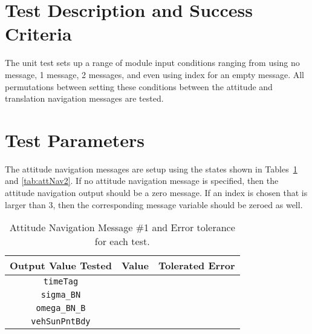
\section{Test Description and Success Criteria}
The unit test sets up a range of module input conditions ranging from using no message, 1 message, 2 messages, and even using index for an empty message.  All permutations between setting these conditions between the attitude and translation navigation messages are tested. 




\section{Test Parameters}

The attitude navigation messages are setup using the states shown in Tables~\ref{tab:attNav1} and \ref{tab:attNav2}.  If no attitude navigation message is specified, then the attitude navigation output should be a zero message.  If an index is chosen that is larger than 3, then the corresponding message variable should be zeroed as well.

\begin{table}[htbp]
	\caption{Attitude Navigation Message \#1 and Error tolerance for each test.}
	\label{tab:attNav1}
	\centering \fontsize{10}{10}\selectfont
	\begin{tabular}{ c | c | c } %
		\hline\hline
		\textbf{Output Value Tested} & \textbf{Value} & \textbf{Tolerated Error}  \\ 
		\hline
		{\tt timeTag}  &       & 	   \\ 
		{\tt sigma\_BN}  &       & 	   \\ 
		{\tt omega\_BN\_B}  &       & 	   \\ 
		{\tt vehSunPntBdy}  &       & 	   \\ 
		\hline\hline
	\end{tabular}
\end{table}

